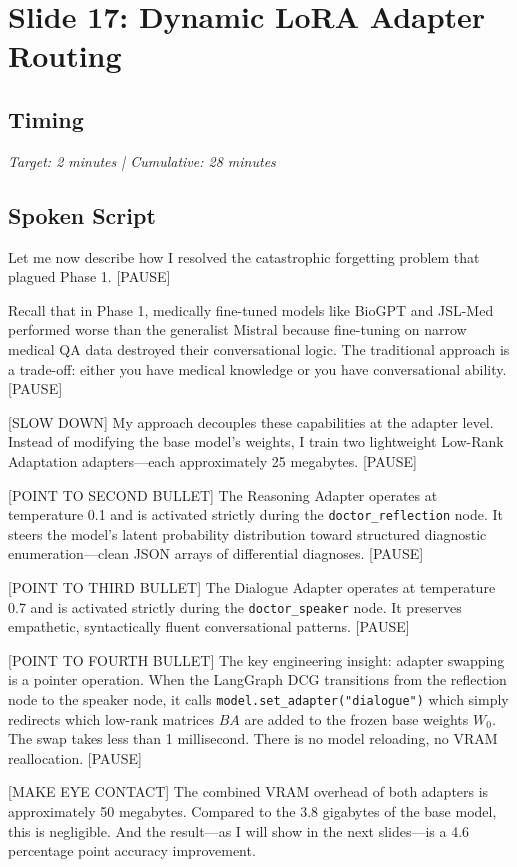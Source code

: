 \documentclass[12pt]{article}
\begin{document}
  \section{Slide 17: Dynamic LoRA Adapter Routing}

  \subsection*{Timing}
  \textit{Target: 2 minutes | Cumulative: 28 minutes}

  \subsection*{Spoken Script}
  \begin{spokenbox}
   Let me now describe how I resolved the catastrophic forgetting problem that plagued Phase 1. [PAUSE]

  Recall that in Phase 1, medically fine-tuned models like BioGPT and JSL-Med performed worse than the generalist Mistral because fine-tuning on narrow medical QA data destroyed their conversational logic. The traditional approach is a trade-off: either you have medical knowledge or you have conversational ability. [PAUSE]

  [SLOW DOWN] My approach decouples these capabilities at the adapter level. Instead of modifying the base model's weights, I train two lightweight Low-Rank Adaptation adapters---each approximately 25 megabytes. [PAUSE]

  [POINT TO SECOND BULLET] The Reasoning Adapter operates at temperature 0.1 and is activated strictly during the \texttt{doctor\_reflection} node. It steers the model's latent probability distribution toward structured diagnostic enumeration---clean JSON arrays of differential diagnoses. [PAUSE]

  [POINT TO THIRD BULLET] The Dialogue Adapter operates at temperature 0.7 and is activated strictly during the \texttt{doctor\_speaker} node. It preserves empathetic, syntactically fluent conversational patterns. [PAUSE]

  [POINT TO FOURTH BULLET] The key engineering insight: adapter swapping is a pointer operation. When the LangGraph DCG transitions from the reflection node to the speaker node, it calls \texttt{model.set\_adapter("dialogue")} which simply redirects which low-rank matrices $BA$ are added to the frozen base weights $W_0$. The swap takes less than 1 millisecond. There is no model reloading, no VRAM reallocation. [PAUSE]

  [MAKE EYE CONTACT] The combined VRAM overhead of both adapters is approximately 50 megabytes. Compared to the 3.8 gigabytes of the base model, this is negligible. And the result---as I will show in the next slides---is a 4.6 percentage point accuracy improvement.
  \end{spokenbox}
\end{document}
